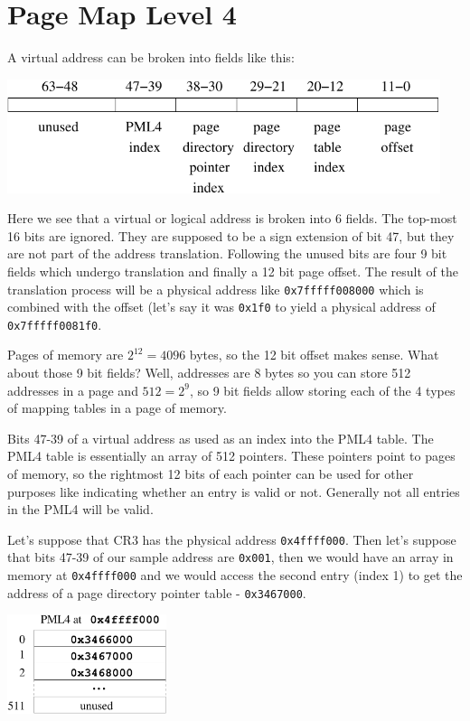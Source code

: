 \documentclass[11pt,b5paper]{book}
\begin{document}
\section{Page Map Level 4}

A virtual address can be broken into fields like this:

\begin{center}
\includegraphics[width=0.95\textwidth]{address.pdf}
\end{center}

Here we see that a virtual or logical address is broken into 6 fields.
The top-most 16 bits are ignored.
They are supposed to be a sign extension of bit 47,
but they are not part of the address translation.
Following the unused bits are four 9 bit fields which undergo translation
and finally a 12 bit page offset.
The result of the translation process will be a physical address like
{\tt 0x7fffff008000} which is combined with the offset (let's say it was {\tt 0x1f0} to yield a physical address of {\tt 0x7fffff0081f0}.

Pages of memory are $2^{12}=4096$ bytes, so the 12 bit offset makes sense.
What about those 9 bit fields?
Well, addresses are 8 bytes so you can store 512 addresses in a page and
$512=2^9$, so 9 bit fields allow storing each of the 4 types of mapping
tables in a page of memory.

Bits 47-39 of a virtual address as used as an index into the PML4 table.
The PML4 table is essentially an array of 512 pointers.
These pointers point to pages of memory, so the rightmost 12 bits of each
pointer can be used for other purposes like indicating whether an entry is
valid or not.
Generally not all entries in the PML4 will be valid.

Let's suppose that CR3 has the physical address {\tt 0x4ffff000}.
Then let's suppose that bits 47-39 of our sample address are {\tt 0x001},
then we would have an array in memory at {\tt 0x4ffff000} and we would
access the second entry (index 1) to get the address of a page directory
pointer table - {\tt 0x3467000}. 

\begin{center}
\includegraphics[width=0.35\textwidth]{pml4.pdf}
\end{center}
\end{document}
